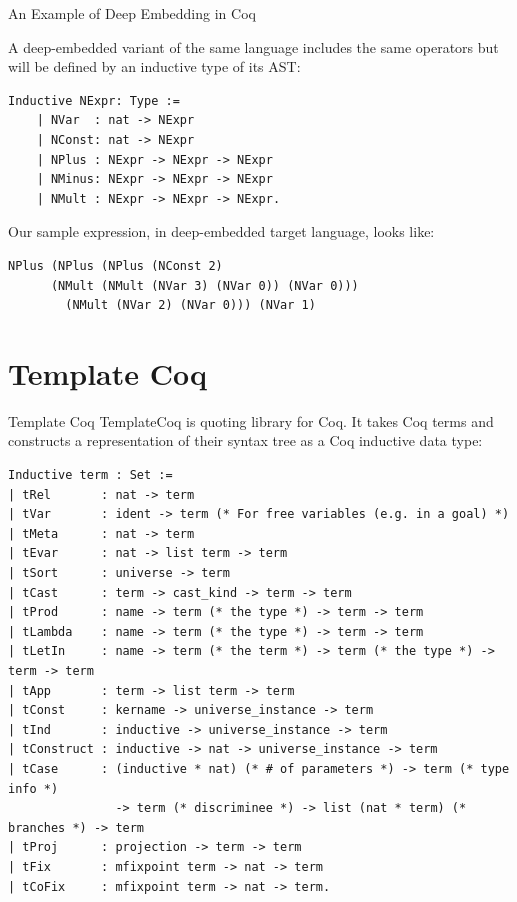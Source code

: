 \documentclass[aspectratio=169]{beamer}
\begin{document}
\begin{frame}[fragile]{An Example of Deep Embedding in Coq}

  A deep-embedded variant of the same language includes the same
  operators but will be defined by an inductive type of its AST:

  \begin{lstlisting}[language=Coq, mathescape=true,
    frame=single, basicstyle=\footnotesize]
    Inductive NExpr: Type :=
    | NVar  : nat -> NExpr 
    | NConst: nat -> NExpr
    | NPlus : NExpr -> NExpr -> NExpr
    | NMinus: NExpr -> NExpr -> NExpr
    | NMult : NExpr -> NExpr -> NExpr.
  \end{lstlisting}

  Our sample expression, in deep-embedded target language, looks like:
  
  \begin{lstlisting}[language=Coq, mathescape=true,
    basicstyle=\footnotesize, frame=single]
    NPlus (NPlus (NPlus (NConst 2)
      (NMult (NMult (NVar 3) (NVar 0)) (NVar 0)))
        (NMult (NVar 2) (NVar 0))) (NVar 1)
  \end{lstlisting}
  
\end{frame}

\section{Template Coq}

\begin{frame}[fragile]{Template Coq}
  TemplateCoq is quoting library for Coq. It takes Coq terms and
  constructs a representation of their syntax tree as a Coq inductive
  data type:

\begin{lstlisting}[language=Coq, mathescape=true, frame=none, basicstyle=\scriptsize]
Inductive term : Set :=
| tRel       : nat -> term
| tVar       : ident -> term (* For free variables (e.g. in a goal) *)
| tMeta      : nat -> term 
| tEvar      : nat -> list term -> term
| tSort      : universe -> term
| tCast      : term -> cast_kind -> term -> term
| tProd      : name -> term (* the type *) -> term -> term
| tLambda    : name -> term (* the type *) -> term -> term
| tLetIn     : name -> term (* the term *) -> term (* the type *) -> term -> term
| tApp       : term -> list term -> term
| tConst     : kername -> universe_instance -> term
| tInd       : inductive -> universe_instance -> term
| tConstruct : inductive -> nat -> universe_instance -> term
| tCase      : (inductive * nat) (* # of parameters *) -> term (* type info *)
               -> term (* discriminee *) -> list (nat * term) (* branches *) -> term
| tProj      : projection -> term -> term
| tFix       : mfixpoint term -> nat -> term
| tCoFix     : mfixpoint term -> nat -> term.
  \end{lstlisting}

\end{frame}
\end{document}
